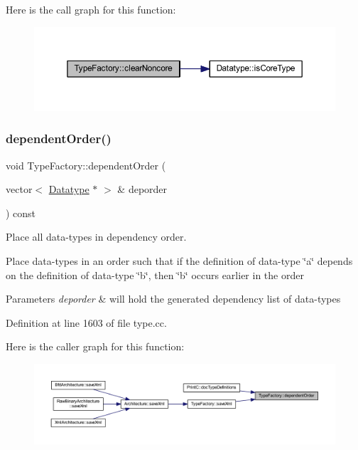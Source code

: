 Here is the call graph for this function\+:
\nopagebreak
\begin{figure}[H]
\begin{center}
\leavevmode
\includegraphics[width=350pt]{class_type_factory_afa4b55a83c2f6dbb6f4f13b5ca930ae4_cgraph}
\end{center}
\end{figure}
\mbox{\label{class_type_factory_ab143d57ae08682ff4fbc28a6ace5a54e}} 
\subsubsection{\texorpdfstring{dependentOrder()}{dependentOrder()}}
{\footnotesize\ttfamily void Type\+Factory\+::dependent\+Order (\begin{DoxyParamCaption}\item[{vector$<$ \mbox{\hyperlink{class_datatype}{Datatype}} $\ast$ $>$ \&}]{deporder }\end{DoxyParamCaption}) const}



Place all data-\/types in dependency order. 

Place data-\/types in an order such that if the definition of data-\/type \char`\"{}a\char`\"{} depends on the definition of data-\/type \char`\"{}b\char`\"{}, then \char`\"{}b\char`\"{} occurs earlier in the order 
\begin{DoxyParams}{Parameters}
{\em deporder} & will hold the generated dependency list of data-\/types \\
\hline
\end{DoxyParams}


Definition at line 1603 of file type.\+cc.

Here is the caller graph for this function\+:
\nopagebreak
\begin{figure}[H]
\begin{center}
\leavevmode
\includegraphics[width=350pt]{class_type_factory_ab143d57ae08682ff4fbc28a6ace5a54e_icgraph}
\end{center}
\end{figure}
\mbox{\label{class_type_factory_ab4edd4fa31629380ec4124c840022f5a}} 
